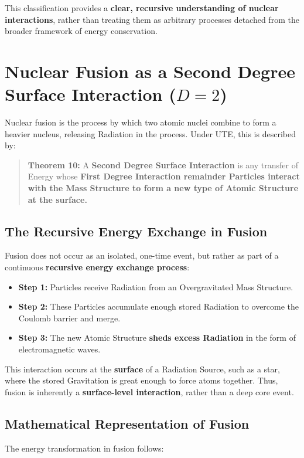 \documentclass{article}
\begin{document}
This classification provides a \textbf{clear, recursive understanding of nuclear interactions}, rather than treating them as arbitrary processes detached from the broader framework of energy conservation.

\section{Nuclear Fusion as a Second Degree Surface Interaction ($D=2$)}
Nuclear fusion is the process by which two atomic nuclei combine to form a heavier nucleus, releasing Radiation in the process. Under UTE, this is described by:

\begin{quotation}
\textbf{Theorem 10:} A \textbf{Second Degree Surface Interaction} is any transfer of Energy whose \textbf{First Degree Interaction remainder Particles interact with the Mass Structure to form a new type of Atomic Structure at the surface.}
\end{quotation}

\subsection{The Recursive Energy Exchange in Fusion}
Fusion does not occur as an isolated, one-time event, but rather as part of a continuous \textbf{recursive energy exchange process}:
\begin{itemize}
    \item \textbf{Step 1:} Particles receive Radiation from an Overgravitated Mass Structure.
    \item \textbf{Step 2:} These Particles accumulate enough stored Radiation to overcome the Coulomb barrier and merge.
    \item \textbf{Step 3:} The new Atomic Structure \textbf{sheds excess Radiation} in the form of electromagnetic waves.
\end{itemize}

This interaction occurs at the \textbf{surface} of a Radiation Source, such as a star, where the stored Gravitation is great enough to force atoms together. Thus, fusion is inherently a \textbf{surface-level interaction}, rather than a deep core event.

\subsection{Mathematical Representation of Fusion}
The energy transformation in fusion follows:
\end{document}
